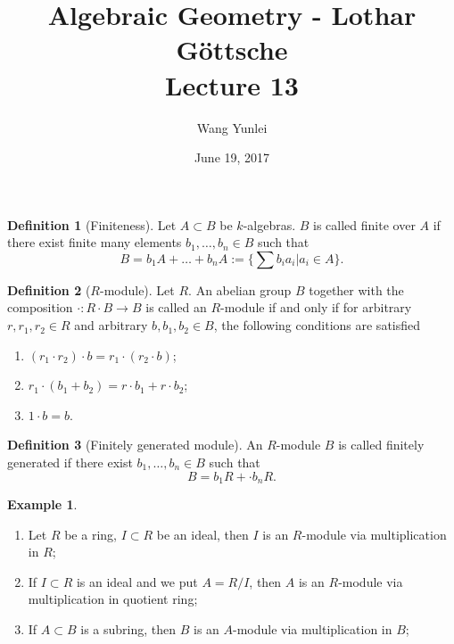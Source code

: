 \documentclass{amsart}
\theoremstyle{plain}
\theoremstyle{definition}
\newtheorem{definition}{Definition}
\newtheorem{example}{Example}
\theoremstyle{remark}
\numberwithin{equation}{section}
\begin{document}
\title[Complete-simple distributive lattices]
{Algebraic Geometry - Lothar G\"{o}ttsche \\
	Lecture 13}
\author{Wang Yunlei}
\date{June 19, 2017}
 
\maketitle

\begin{definition}[Finiteness]
	Let $ A\subset B $ be $ k $-algebras. $ B $ is called finite over $ A $ if there exist finite many elements $ b_1,\dots,b_n\in B $ such that 
	$$
	B=b_1 A+\dots+b_n A:=\lbrace \sum b_ia_i|a_i\in A \rbrace.
	$$
\end{definition}
\begin{definition}[$ R $-module]
	Let $ R $. An abelian group $ B $ together with the composition $ \cdot:R\cdot B\to B $ is called an $ R $-module if and only if for arbitrary $ r,r_1,r_2\in R $ and arbitrary $ b,b_1,b_2 \in B$, the following conditions are satisfied\begin{enumerate}
		\item $ (r_1\cdot r_2)\cdot b = r_1\cdot (r_2\cdot b) $;
		\item $ r_1\cdot(b_1+b_2)=r\cdot b_1+r\cdot b_2 $;
		\item $ 1\cdot b = b $.
	\end{enumerate}
\end{definition}
\begin{definition}[Finitely generated module]
	An $ R $-module $ B $ is called finitely generated if there exist $ b_1,\dots,b_n\in B $ such that 
	$$
	B=b_1R+\cdot b_n R.
	$$
\end{definition}
 \begin{example}
 	\begin{enumerate}
 		\item Let $ R $ be a ring, $ I\subset R $ be an ideal, then $ I $ is an $ R $-module via multiplication in $ R $;
 		\item If $ I\subset R $ is an ideal and we put $ A=R\slash I $, then $ A $ is an $ R $-module via multiplication in quotient ring;
 		\item If $ A\subset B $ is a subring, then $ B $ is an $ A $-module via multiplication in $ B $;
 	\end{enumerate}
 \end{example}
\end{document}
